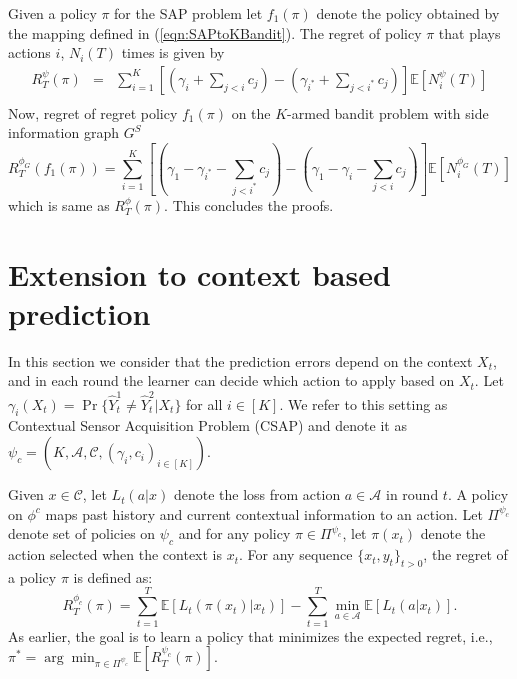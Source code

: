 \documentclass{article}
\begin{document}
Given a policy $\pi$ for the SAP problem let $f_1(\pi)$ denote the policy obtained by the mapping defined in (\ref{eqn:SAPtoKBandit}). The regret of policy $\pi$ that plays actions $i$, $N_i(T)$ times is given by 
\begin{eqnarray}
R^\psi_T(\pi) &=&\sum_{i=1}^{K}\left [ \left (\gamma_{i}+\sum_{j< i} c_j\right )-\left (\gamma_{i^*}+\sum_{j < i^*} c_j\right )\right ]\mathbb{E}[N^\psi_i(T)]\\
\end{eqnarray}
Now, regret of regret policy $f_1(\pi)$ on the $K$-armed bandit problem with side information graph $G^S$ 
\begin{equation}
R^{\phi_G}_T(f_1(\pi))=\sum_{i=1}^{K} \left[\left (\gamma_1-\gamma_{i^*}-\sum_{j <i^*} c_j \right )-\left (\gamma_1- \gamma_{i}-\sum_{j < i} c_j \right )\right ]\mathbb{E}[N^{\phi_G}_i(T)]
\end{equation}
which is same as $R^\phi_T(\pi)$. This concludes the proofs. 


\section{Extension to context based prediction}
\label{sec:Contextual}
In this section we consider that the prediction errors depend on the context $X_t$, and in each round the learner can decide which action to apply based on $X_t$. Let  $\gamma_i(X_t)=\Pr\{\hat{Y}^1_t \neq \hat{Y}^2_t| X_t\}$ for all $i \in [K]$. We refer to this setting as  Contextual Sensor Acquisition Problem (CSAP) and denote it as $\psi_c=(K, \mathcal{A}, \mathcal{C}, (\gamma_i,c_i)_{i\in [K]})$. 

Given $x \in \mathcal{C}$, let $L_t(a|x)$ denote the loss from action $a\in \mathcal{A}$ in round $t$. A policy on $\phi^c$ maps past history and current contextual information to an action. Let $\Pi^{\psi_c}$ denote set of policies on $\psi_c$ and for any policy $\pi \in \Pi^{\psi_c}$, let $\pi(x_t)$ denote the action selected when the context is $x_t$. For any sequence $\{x_t,y_t\}_{t>0}$, the regret of a policy $\pi$ is defined as:
\begin{equation}
	R^{\phi_c}_T(\pi)= \sum_{t=1}^{T} \mathbb{E}\left [L_t(\pi(x_t)|x_t)\right ]-\sum_{t=1}^{T}\min_{a \in \mathcal{A}} \mathbb{E} \left [ L_t(a|x_t)\right ]. 
\end{equation}
As earlier, the goal is to learn a policy that minimizes the expected regret, i.e., $\pi^*= \arg \min_{\pi \in \Pi^{\psi_c}} \mathbb{E}[R^{\psi_c}_T(\pi)].$
\end{document}
